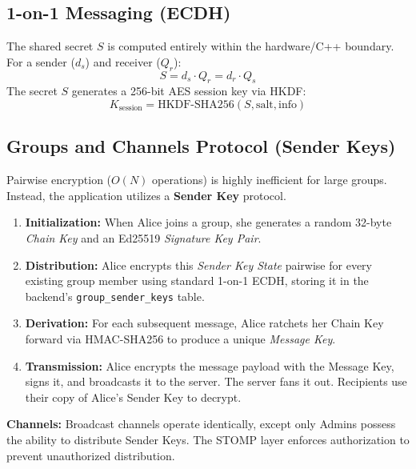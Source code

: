 \documentclass[12pt, a4paper]{article}
\begin{document}
\subsection{1-on-1 Messaging (ECDH)}
The shared secret $S$ is computed entirely within the hardware/C++ boundary. For a sender ($d_s$) and receiver ($Q_r$):
$$S = d_s \cdot Q_r = d_r \cdot Q_s$$
The secret $S$ generates a 256-bit AES session key via HKDF:
$$K_{\text{session}} = \text{HKDF-SHA256}(S, \text{salt}, \text{info})$$

\subsection{Groups and Channels Protocol (Sender Keys)}
Pairwise encryption ($O(N)$ operations) is highly inefficient for large groups. Instead, the application utilizes a \textbf{Sender Key} protocol.
\begin{enumerate}
    \item \textbf{Initialization:} When Alice joins a group, she generates a random 32-byte \textit{Chain Key} and an Ed25519 \textit{Signature Key Pair}.
    \item \textbf{Distribution:} Alice encrypts this \textit{Sender Key State} pairwise for every existing group member using standard 1-on-1 ECDH, storing it in the backend's \texttt{group\_sender\_keys} table.
    \item \textbf{Derivation:} For each subsequent message, Alice ratchets her Chain Key forward via HMAC-SHA256 to produce a unique \textit{Message Key}.
    \item \textbf{Transmission:} Alice encrypts the message payload with the Message Key, signs it, and broadcasts it to the server. The server fans it out. Recipients use their copy of Alice's Sender Key to decrypt.
\end{enumerate}

\textbf{Channels:} Broadcast channels operate identically, except only Admins possess the ability to distribute Sender Keys. The STOMP layer enforces authorization to prevent unauthorized distribution.
\end{document}

